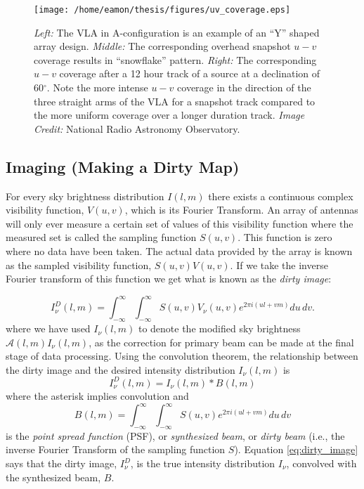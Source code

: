 \begin{figure}[hbt!]
\centering 
          \texttt{[image: /home/eamon/thesis/figures/uv\_coverage.eps]}
\caption[VLA antenna layout and two examples of $u-v$ coverage]{\textit{Left:} The VLA in A-configuration is an example of an ``Y'' shaped array design. \textit{Middle:} The corresponding overhead snapshot $u-v$ coverage results in ``snowflake'' pattern. \textit{Right:} The corresponding $u-v$ coverage after a 12 hour track of a source at a declination of 60$^{\circ}$. Note the more intense $u-v$ coverage in the direction of the three straight arms of the VLA for a snapshot track compared to the more uniform coverage over a longer duration track. \textit{Image Credit:} National Radio Astronomy Observatory.}
\label{fig2.9}
\end{figure}

\subsection{Imaging (Making a Dirty Map)}\label{subsec:4.2}
For every sky brightness distribution $I(l,m)$ there exists a continuous complex visibility function, $V(u,v)$, which is its Fourier Transform. An array of antennas will only ever measure a certain set of values of this visibility function where the measured set is called the sampling function $S(u,v)$. This function is zero where no data have been taken. The actual data provided by the array is known as the sampled visibility function, $S(u,v)V(u,v)$. If we take the inverse Fourier transform of this function we get what is known as the \textit{dirty image}:

\begin{equation}\label{eq:dirtyim}
I_{\nu}^{D}(l,m)=\int ^{\infty}_{-\infty}\int ^{\infty}_{-\infty}S(u,v)V_{\nu}(u,v)\mathit{e}^{2\pi \mathit{i}(ul+vm)}du\,dv.
\end{equation}
where we have used $I_{\nu}(l,m)$ to denote the modified sky brightness $\mathcal{A}(l,m)I_{\nu}(l,m)$, as the correction for primary beam can be made at the final stage of data processing. Using the convolution theorem, the relationship between the dirty image and the desired intensity distribution $I_{\nu}(l,m)$ is
\begin{equation}\label{eq:dirty_image}
I_{\nu}^{D}(l,m)=I_{\nu}(l,m)*B(l,m)
\end{equation}
where the asterisk implies convolution and
\begin{equation}\label{beam_samp}
B(l,m) = \int ^{\infty}_{-\infty}\int ^{\infty}_{-\infty}S(u,v)\mathit{e}^{2\pi \mathit{i}(ul+vm)}du\,dv
\end{equation}
is the \textit{point spread function} (PSF), or \textit{synthesized beam}, or \textit{dirty beam} (i.e., the inverse Fourier Transform of the sampling function $S$). Equation \ref{eq:dirty_image} says that the dirty image, $I^{D}_{\nu}$, is the true intensity distribution $I_{\nu}$, convolved with the synthesized beam, $B$.

